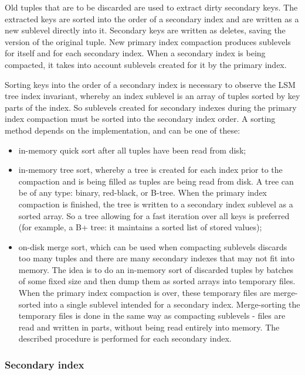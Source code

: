 \documentclass{vldb}
\begin{document}
Old tuples that are to be discarded are used to extract dirty secondary keys.
The extracted keys are sorted into the order of a secondary index and are written as
a new sublevel directly into it. Secondary keys are written as deletes, saving the
version of the original tuple. New primary index compaction produces sublevels for
itself and for each secondary index. When a secondary index is being compacted, it takes
into account sublevels created for it by the primary index.

Sorting keys into the order of a secondary index is necessary to observe the LSM tree
index invariant, whereby an index sublevel is an array of tuples sorted by key
parts of the index. So sublevels created for secondary indexes during the primary
index compaction must be sorted into the secondary index order. A sorting method
depends on the implementation, and can be one of these:
\begin{itemize}
\item in-memory quick sort after all tuples have been read from disk;
\item in-memory tree sort, whereby a tree is created for each index prior to the
compaction and is being filled as tuples are being read from disk. A tree can be of
any type: binary, red-black, or B-tree. When the primary index compaction is finished, the
tree is written to a secondary index sublevel as a sorted array. So a tree allowing for a fast
iteration over all keys is preferred (for example, a B+ tree: it maintains a sorted list
of stored values);
\item on-disk merge sort, which can be used when compacting sublevels discards too
many tuples and there are many secondary indexes that may not fit into memory.
The idea is to do an in-memory sort of discarded tuples by batches of some fixed
size and then dump them as sorted arrays into temporary files. When the primary index
compaction is over, these temporary files are merge-sorted into a single sublevel
intended for a secondary index. Merge-sorting the temporary files is done in the same
way as compacting sublevels - files are read and written in parts, without being read
entirely into memory. The described procedure is performed for each secondary index.
\end{itemize}

\subsubsection{Secondary index}
\end{document}
